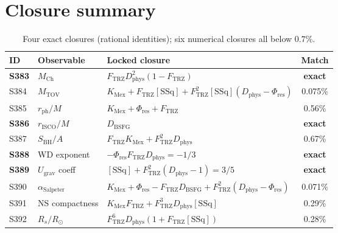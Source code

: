 \documentclass[11pt]{article}
\newcommand{\Ftrz}{F_{\mathrm{TRZ}}}
\newcommand{\Phires}{\Phi_{\mathrm{res}}}
\newcommand{\KMex}{K_{\mathrm{Mex}}}
\newcommand{\Dphys}{D_{\mathrm{phys}}}
\newcommand{\Dbsfg}{D_{\mathrm{BSFG}}}
\newcommand{\SSq}{[\mathrm{SSq}]}
\begin{document}
\section{Closure summary}
\begin{table}[h!]
\centering
\begin{tabular}{lllc}
\toprule
ID & Observable & Locked closure & Match \\
\midrule
\textbf{S383} & $M_{\text{Ch}}$        & $\Ftrz\Dphys^{2}(1-\Ftrz)$                       & \textbf{exact} \\
S384 & $M_{\text{TOV}}$               & $\KMex+\Ftrz\SSq+\Ftrz^{2}\SSq(\Dphys-\Phires)$  & 0.075\% \\
S385 & $r_{\text{ph}}/M$              & $\KMex+\Phires+\Ftrz$                            & 0.56\% \\
\textbf{S386} & $r_{\text{ISCO}}/M$    & $\Dbsfg$                                         & \textbf{exact} \\
S387 & $S_{\text{BH}}/A$               & $\Ftrz\KMex+\Ftrz^{2}\Dphys$                     & 0.67\% \\
\textbf{S388} & WD exponent           & $-\Phires\Ftrz\Dphys=-1/3$                       & \textbf{exact} \\
\textbf{S389} & $U_{\text{grav}}$ coeff & $\SSq+\Ftrz^{2}(\Dphys-1)=3/5$                  & \textbf{exact} \\
S390 & $\alpha_{\text{Salpeter}}$      & $\KMex+\Phires-\Ftrz\Dbsfg+\Ftrz^{2}(\Dphys-\Phires)$ & 0.071\% \\
S391 & NS compactness                  & $\KMex\Ftrz+\Ftrz^{3}\Dphys\SSq$                & 0.29\% \\
S392 & $R_s/R_\odot$                   & $\Ftrz^{6}\Dphys(1+\Ftrz\SSq)$                  & 0.28\% \\
\bottomrule
\end{tabular}
\caption{Four exact closures (rational identities); six numerical
closures all below $0.7\%$.}
\end{table}
\end{document}
